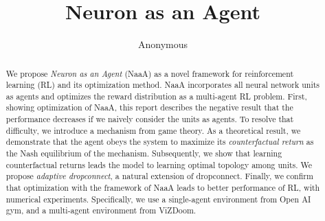 \documentclass{article} %
\title{Neuron as an Agent}
\author{Anonymous}
\begin{document}
\maketitle

\begin{abstract}
We propose {\em Neuron as an Agent} (NaaA) as a novel framework for reinforcement learning (RL) and its optimization method.
NaaA incorporates all neural network units as agents and optimizes the reward distribution as a multi-agent RL problem.
First, showing optimization of NaaA, this report describes the negative result that the performance decreases if we naively consider the units as agents.
To resolve that difficulty, we introduce a mechanism from game theory.
As a theoretical result, we demonstrate that the agent obeys the system to maximize its {\em counterfactual return} as the Nash equilibrium of the mechanism.
Subsequently, we show that learning counterfactual returns leads the model to learning optimal topology among units.
We propose {\em adaptive dropconnect}, a natural extension of dropconnect.
Finally, we confirm that optimization with the framework of NaaA leads to better performance of RL, with numerical experiments.
Specifically, we use a single-agent environment from Open AI gym, and a multi-agent environment from ViZDoom.
\end{abstract}














\end{document}

